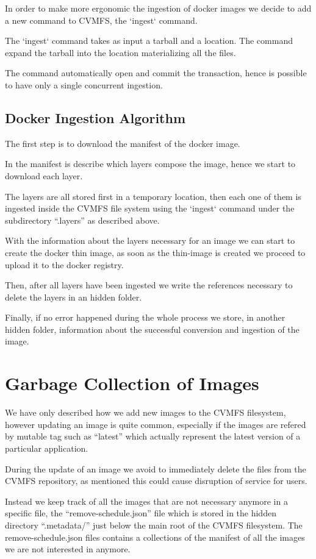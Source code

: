 In order to make more ergonomic the ingestion of docker images we decide to add
a new command to CVMFS, the `ingest` command.

The `ingest` command takes as input a tarball and a location. The command
expand the tarball into the location materializing all the files.

The command automatically open and commit the transaction, hence is possible to
have only a single concurrent ingestion.

\subsection{Docker Ingestion Algorithm}

The first step is to download the manifest of the docker image.

In the manifest is describe which layers compose the image, hence we start to
download each layer.

The layers are all stored first in a temporary location, then each one of them
is ingested inside the CVMFS file system using the `ingest` command under the
subdirectory “.layers” as described above.

With the information about the layers necessary for an image we can start to
create the docker thin image, as soon as the thin-image is created we proceed
to upload it to the docker registry.

Then, after all layers have been ingested we write the references necessary to
delete the layers in an hidden folder.

Finally, if no error happened during the whole process we store, in another
hidden folder, information about the successful conversion and ingestion of the
image.

\section{Garbage Collection of Images}

We have only described how we add new images to the CVMFS filesystem, however
updating an image is quite common, especially if the images are refered by
mutable tag such as “latest” which actually represent the latest version of a
particular application.

During the update of an image we avoid to immediately delete the files from the
CVMFS repository, as mentioned this could cause disruption of service for
users.

Instead we keep track of all the images that are not necessary anymore in a
specific file, the “remove-schedule.json” file which is stored in the hidden
directory “.metadata/” just below the main root of the CVMFS filesystem. The
remove-schedule.json files contains a collections of the manifest of all the
images we are not interested in anymore.

